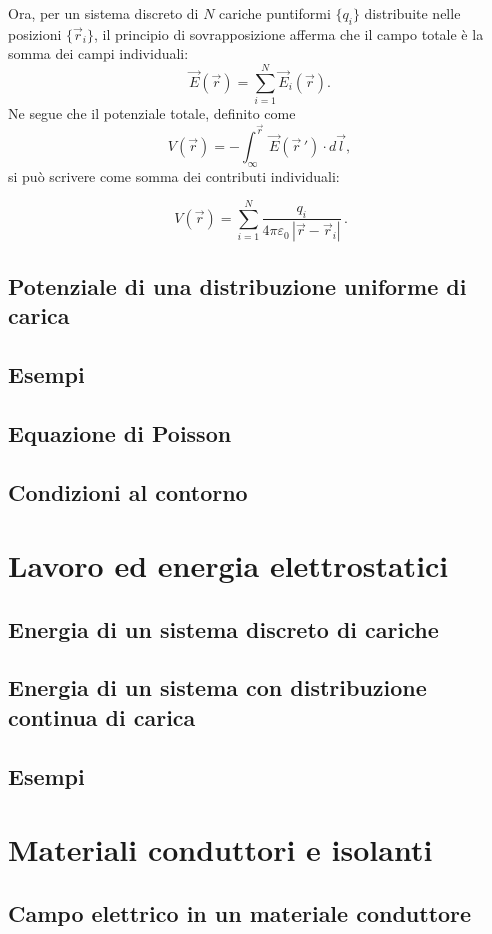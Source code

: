 \documentclass{book}
\begin{document}
Ora, per un sistema discreto di \(N\) cariche puntiformi \(\{q_i\}\) distribuite nelle posizioni \(\{\vec r_i\}\), il principio di sovrapposizione afferma che il campo totale è la somma dei campi individuali:
\[
\vec{E}(\vec r)=\sum_{i=1}^N \vec{E}_i(\vec r).
\]
Ne segue che il potenziale totale, definito come
\[
V(\vec r) = -\int_{\infty}^{\vec r} \vec{E}(\vec r\,')\cdot d\vec l,
\]
si può scrivere come somma dei contributi individuali:

\[
\boxed{\,V(\vec r)=\sum_{i=1}^{N}\dfrac{q_i}{4\pi\varepsilon_0\,|\vec r-\vec r_i|}\, .}
\]

\section{Potenziale di una distribuzione uniforme di carica}


\section{Esempi}
\section{Equazione di Poisson}
\section{Condizioni al contorno}

\chapter{Lavoro ed energia elettrostatici}
\section{Energia di un sistema discreto di cariche}
\section{Energia di un sistema con distribuzione continua di carica}
\section{Esempi}

\chapter{Materiali conduttori e isolanti}
\section{Campo elettrico in un materiale conduttore}
\end{document}
